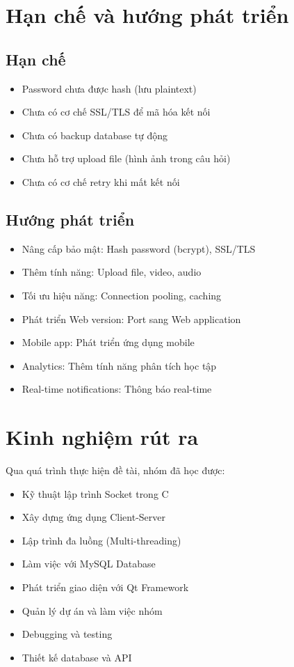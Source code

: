﻿\documentclass[12pt,a4paper]{report}
\begin{document}
\section{Hạn chế và hướng phát triển}

\subsection{Hạn chế}

\begin{itemize}
    \item Password chưa được hash (lưu plaintext)
    \item Chưa có cơ chế SSL/TLS để mã hóa kết nối
    \item Chưa có backup database tự động
    \item Chưa hỗ trợ upload file (hình ảnh trong câu hỏi)
    \item Chưa có cơ chế retry khi mất kết nối
\end{itemize}

\subsection{Hướng phát triển}

\begin{itemize}
    \item Nâng cấp bảo mật: Hash password (bcrypt), SSL/TLS
    \item Thêm tính năng: Upload file, video, audio
    \item Tối ưu hiệu năng: Connection pooling, caching
    \item Phát triển Web version: Port sang Web application
    \item Mobile app: Phát triển ứng dụng mobile
    \item Analytics: Thêm tính năng phân tích học tập
    \item Real-time notifications: Thông báo real-time
\end{itemize}

\section{Kinh nghiệm rút ra}

Qua quá trình thực hiện đề tài, nhóm đã học được:

\begin{itemize}
    \item Kỹ thuật lập trình Socket trong C
    \item Xây dựng ứng dụng Client-Server
    \item Lập trình đa luồng (Multi-threading)
    \item Làm việc với MySQL Database
    \item Phát triển giao diện với Qt Framework
    \item Quản lý dự án và làm việc nhóm
    \item Debugging và testing
    \item Thiết kế database và API
\end{itemize}
\end{document}
